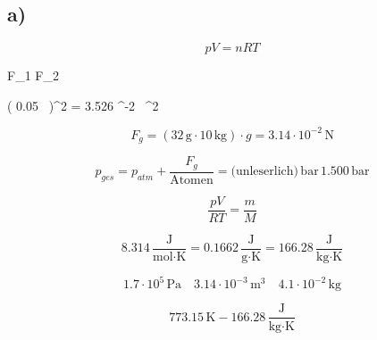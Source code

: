 

\subsection*{a)}

\begin{equation*}
pV = nRT
\end{equation*}

 \quad {} F_1  F_2 \text{)}

 \quad \left( 0.05 \,  \right)^2 \quad \Pi = 3.526 ^{-2} \, ^2

\begin{equation*}
F_g = (32 \, \text{g} \cdot 10 \, \text{kg}) \cdot g = 3.14 \cdot 10^{-2} \, \text{N}
\end{equation*}

\begin{equation*}
p_{ges} = p_{atm} + \frac{F_g}{\text{Atomen}} = \text{(unleserlich)} \, \text{bar} \, 1.500 \, \text{bar}
\end{equation*}

\begin{equation*}
\frac{pV}{RT} = \frac{m}{M}
\end{equation*}

\begin{equation*}
8.314 \, \frac{\text{J}}{\text{mol} \cdot \text{K}} = 0.1662 \, \frac{\text{J}}{\text{g} \cdot \text{K}} = 166.28 \, \frac{\text{J}}{\text{kg} \cdot \text{K}}
\end{equation*}

\begin{equation*}
1.7 \cdot 10^5 \, \text{Pa} \quad 3.14 \cdot 10^{-3} \, \text{m}^3 \quad 4.1 \cdot 10^{-2} \, \text{kg}
\end{equation*}

\begin{equation*}
773.15 \, \text{K} - 166.28 \, \frac{\text{J}}{\text{kg} \cdot \text{K}}
\end{equation*}